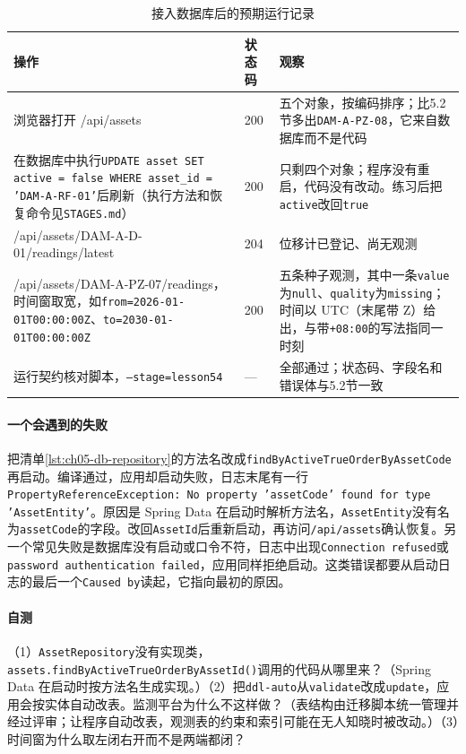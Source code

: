 \begin{table}[htbp]
\centering
\caption{接入数据库后的预期运行记录}
\label{tab:ch05-db-run}
\begin{tabular}{p{}p{}p{}}
\toprule
操作 & 状态码 & 观察 \\
\midrule
浏览器打开 /api/assets & 200 & 五个对象，按编码排序；比5.2节多出\texttt{DAM-A-PZ-08}，它来自数据库而不是代码 \\
在数据库中执行\texttt{UPDATE asset SET active = false WHERE asset\_id = 'DAM-A-RF-01'}后刷新（执行方法和恢复命令见\texttt{STAGES.md}） & 200 & 只剩四个对象；程序没有重启，代码没有改动。练习后把\texttt{active}改回\texttt{true} \\
/api/assets/DAM-A-D-01/readings/latest & 204 & 位移计已登记、尚无观测 \\
/api/assets/DAM-A-PZ-07/readings，时间窗取宽，如\texttt{from=2026-01-01T00:00:00Z}、\texttt{to=2030-01-01T00:00:00Z} & 200 & 五条种子观测，其中一条\texttt{value}为\texttt{null}、\texttt{quality}为\texttt{missing}；时间以 UTC（末尾带 Z）给出，与带\texttt{+08:00}的写法指同一时刻 \\
运行契约核对脚本，\texttt{--stage=lesson54} & — & 全部通过；状态码、字段名和错误体与5.2节一致 \\
\bottomrule
\end{tabular}
\end{table}

\paragraph{一个会遇到的失败}把清单\ref{lst:ch05-db-repository}的方法名改成\texttt{findByActiveTrueOrderByAssetCode}再启动。编译通过，应用却启动失败，日志末尾有一行\texttt{PropertyReferenceException: No property 'assetCode' found for type 'AssetEntity'}。原因是 Spring Data 在启动时解析方法名，\texttt{AssetEntity}没有名为\texttt{assetCode}的字段。改回\texttt{AssetId}后重新启动，再访问\texttt{/api/assets}确认恢复。另一个常见失败是数据库没有启动或口令不符，日志中出现\texttt{Connection refused}或\texttt{password authentication failed}，应用同样拒绝启动。这类错误都要从启动日志的最后一个\texttt{Caused by}读起，它指向最初的原因。

\paragraph{自测}（1）\texttt{AssetRepository}没有实现类，\texttt{assets.findByActiveTrueOrderByAssetId()}调用的代码从哪里来？（Spring Data 在启动时按方法名生成实现。）（2）把\texttt{ddl-auto}从\texttt{validate}改成\texttt{update}，应用会按实体自动改表。监测平台为什么不这样做？（表结构由迁移脚本统一管理并经过评审；让程序自动改表，观测表的约束和索引可能在无人知晓时被改动。）（3）时间窗为什么取左闭右开而不是两端都闭？

